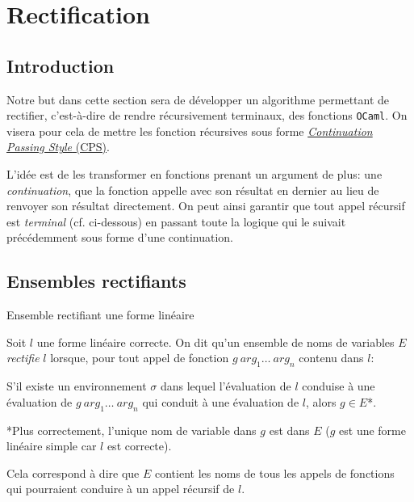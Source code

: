 \section{Rectification}

\subsection{Introduction}

Notre but dans cette section sera de développer un algorithme permettant de
rectifier, c'est-à-dire de rendre récursivement terminaux, des fonctions
\texttt{OCaml}. On visera pour cela de mettre les fonction récursives sous forme
\href{https://en.wikipedia.org/wiki/Continuation-passing_style}{\textit{Continuation Passing Style} (CPS)}.

L'idée est de les transformer en fonctions prenant un argument de plus: une
\textit{continuation}, que la fonction appelle avec son résultat en dernier au
lieu de renvoyer son résultat directement. On peut ainsi garantir que tout appel
récursif est \textit{terminal} (cf. ci-dessous) en passant toute la logique qui
le suivait précédemment sous forme d'une continuation.


\subsection{Ensembles rectifiants}

\begin{definition}
    Ensemble rectifiant une forme linéaire

    Soit $l$ une forme linéaire correcte. On dit qu'un ensemble de noms de
    variables $E$ \textit{rectifie} $l$ lorsque, pour tout appel de fonction
    $g\ arg_1 \ldots\ arg_n$ contenu dans $l$:

    \indent S'il existe un environnement $\sigma$ dans lequel l'évaluation de
    $l$ conduise à une évaluation de $g\ arg_1 \ldots\ arg_n$ qui conduit à une
    évaluation de $l$, alors $g \in E$*.

    *Plus correctement, l'unique nom de variable dans $g$ est dans $E$ ($g$ est
    une forme linéaire simple car $l$ est correcte).
\end{definition}

\begin{remark}
    Cela correspond à dire que $E$ contient les noms de tous les appels de
    fonctions qui pourraient conduire à un appel récursif de $l$.
\end{remark}

